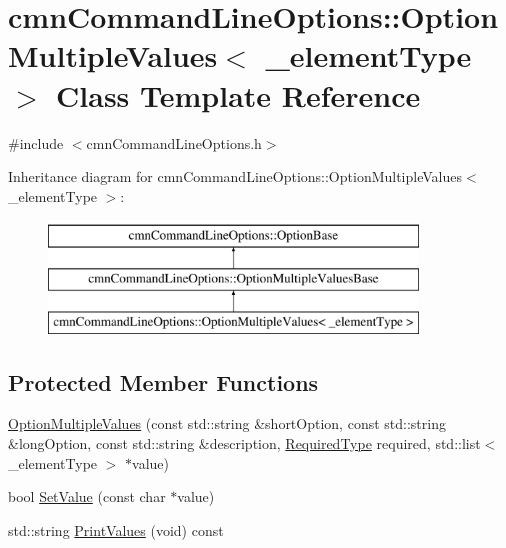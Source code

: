 \hypertarget{classcmn_command_line_options_1_1_option_multiple_values}{}\section{cmn\+Command\+Line\+Options\+:\+:Option\+Multiple\+Values$<$ \+\_\+element\+Type $>$ Class Template Reference}
\label{classcmn_command_line_options_1_1_option_multiple_values}


{\ttfamily \#include $<$cmn\+Command\+Line\+Options.\+h$>$}

Inheritance diagram for cmn\+Command\+Line\+Options\+:\+:Option\+Multiple\+Values$<$ \+\_\+element\+Type $>$\+:\begin{figure}[H]
\begin{center}
\leavevmode
\includegraphics[height=3.000000cm]{d6/deb/classcmn_command_line_options_1_1_option_multiple_values}
\end{center}
\end{figure}
\subsection*{Protected Member Functions}
\begin{DoxyCompactItemize}
\item 
\hyperlink{classcmn_command_line_options_1_1_option_multiple_values_ad084b5b69457ae2be02ea8dd60de4acd}{Option\+Multiple\+Values} (const std\+::string \&short\+Option, const std\+::string \&long\+Option, const std\+::string \&description, \hyperlink{group__cisst_common_gac239a3ca62dd4e3b391824f6f1a97c76}{Required\+Type} required, std\+::list$<$ \+\_\+element\+Type $>$ $\ast$value)
\item 
bool \hyperlink{classcmn_command_line_options_1_1_option_multiple_values_aeae0f5051c46d779f38a026753a7e5d0}{Set\+Value} (const char $\ast$value)
\item 
std\+::string \hyperlink{classcmn_command_line_options_1_1_option_multiple_values_abcb492c87a3ad314522c9d3e5b86d7ae}{Print\+Values} (void) const 
\end{DoxyCompactItemize}
